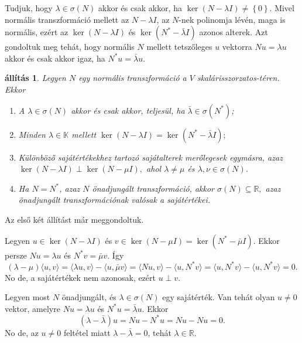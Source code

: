 \documentclass[9pt, a4paper, showtrims]{memoir}
\makeatletter
\renewenvironment{proof}[1][\proofname]
    {\par\pushQED{\qed}%
    \normalfont \topsep6\p@\@plus6\p@\relax
    \trivlist
    \item[\hskip\labelsep
        \itshape
    #1\@addpunct{:}]\ignorespaces}
    {\popQED\endtrivlist\@endpefalse}
\theoremstyle{plain}
\newtheorem{proposition}{állítás}[chapter]
\theoremstyle{remark}
\theoremstyle{definition}
\newcommand{\ip}[2]{\langle#1,#2\rangle}
\makeatother
\begin{document}
Tudjuk, hogy $\lambda\in\sigma(N)$ akkor és csak akkor, ha $\ker(N-\lambda I)\neq \left\{ 0 \right\}$.
Mivel normális transzformáció mellett az $N-\lambda I$,
az $N$-nek polinomja lévén,
maga is normális,
ezért az $\ker (N-\lambda I)$ és $\ker (N^\ast-\bar{\lambda}I)$ azonos alterek.
Azt gondoltuk meg tehát, hogy normális $N$ mellett
tetszőleges $u$ vektorra $Nu=\lambda u$ akkor és csak akkor igaz, ha $N^\ast u=\bar{\lambda}u$.
\begin{proposition}\label{pr:normtul}
	Legyen $N$ egy normális transzformáció a $V$ skalárisszorzatos-téren.
	Ekkor
	\begin{enumerate}
		\item
		      A $\lambda\in\sigma\left( N \right)$ akkor és csak akkor,
		      teljesül, ha
		      $\bar{\lambda}\in\sigma\left( N^\ast \right)$;
		\item
		      Minden $\lambda\in\mathbb{K}$ mellett
		      \begin{math}
			      \ker (N-\lambda I)=\ker (N^\ast-\bar{\lambda}I);
		      \end{math}
		\item
		      Különböző sajátértékekhez tartozó sajátalterek merőlegesek egymásra, azaz
		      \begin{math}
			      \ker \left( N-\lambda I \right)\perp\ker\left( N-\mu I \right),
		      \end{math}
		      ahol $\lambda\neq \mu$ és $\lambda,\nu\in\sigma\left( N \right)$.
		\item Ha $N=N^\ast$, azaz $N$ önadjungált transzformáció, akkor
		      \begin{math}
			      \sigma\left( N \right)\subseteq \mathbb{R},
		      \end{math}
		      azaz önadjungált transzformációnak valósak a sajátértékei.
		      \qedhere
	\end{enumerate}
\end{proposition}
\begin{proof}
	Az első két állítást már meggondoltuk.

	Legyen
	\begin{math}
		u\in\ker\left( N-\lambda I \right)
	\end{math}
	és
	\begin{math}
        v\in\ker\left( N-\mu I \right)=\ker\left( N^\ast-\bar{\mu}I \right)
	\end{math}.
	Ekkor persze
	\begin{math}
		Nu=\lambda u
	\end{math}
	és
	\begin{math}
		N^\ast v=\bar{\mu}v
	\end{math}.
	Így
	\[
		\left( \lambda-\mu \right)\ip{u}{v}
		=
		\ip{\lambda u}{v}-\ip{u}{\bar{\mu}v}
		=
		\ip{Nu}{v}-\ip{u}{N^\ast v}
		=
		\ip{u}{N^\ast v}-\ip{u}{N^\ast v}
		=
		0.
	\]
	No de, a sajátértékek nem azonosak,
	ezért $u\perp v$.

	Legyen most $N$ önadjungált, és $\lambda\in\sigma\left( N \right)$ egy sajátérték.
	Van tehát olyan $u\neq 0$ vektor, amelyre $Nu=\lambda u$ és $N^\ast u=\bar{\lambda}u$.
	Ekkor
	\[
		\left( \lambda-\bar{\lambda} \right)u
		=Nu-N^\ast u=Nu-Nu=0.
	\]
	No de, az $u\neq 0$ feltétel miatt $\lambda-\bar{\lambda}=0$, tehát $\lambda\in\mathbb{R}.$
\end{proof}
\end{document}
